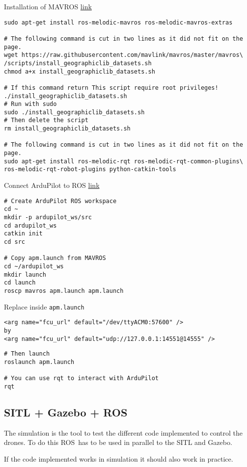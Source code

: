 Installation of MAVROS \href{http://ardupilot.org/dev/docs/ros-install.html#installing-mavros}{link}
\begin{verbatim}
sudo apt-get install ros-melodic-mavros ros-melodic-mavros-extras

# The following command is cut in two lines as it did not fit on the page.
wget https://raw.githubusercontent.com/mavlink/mavros/master/mavros\
/scripts/install_geographiclib_datasets.sh
chmod a+x install_geographiclib_datasets.sh

# If this command return This script require root privileges!
./install_geographiclib_datasets.sh
# Run with sudo
sudo ./install_geographiclib_datasets.sh
# Then delete the script
rm install_geographiclib_datasets.sh

# The following command is cut in two lines as it did not fit on the page.
sudo apt-get install ros-melodic-rqt ros-melodic-rqt-common-plugins\ ros-melodic-rqt-robot-plugins python-catkin-tools
            \end{verbatim}

Connect ArduPilot to ROS \href{http://ardupilot.org/dev/docs/ros-sitl.html}{link}
\begin{verbatim}
# Create ArduPilot ROS workspace
cd ~
mkdir -p ardupilot_ws/src
cd ardupilot_ws
catkin init
cd src

# Copy apm.launch from MAVROS
cd ~/ardupilot_ws
mkdir launch
cd launch
roscp mavros apm.launch apm.launch
            \end{verbatim}

Replace inside \texttt{apm.launch}
\begin{verbatim}
<arg name="fcu_url" default="/dev/ttyACM0:57600" />
by
<arg name="fcu_url" default="udp://127.0.0.1:14551@14555" />
            \end{verbatim}

\begin{verbatim}
# Then launch
roslaunch apm.launch

# You can use rqt to interact with ArduPilot
rqt
            \end{verbatim}

\subsection{SITL + Gazebo + ROS}
The simulation is the tool to test the different code implemented to control the drones.
To do this ROS has to be used in parallel to the SITL and Gazebo.

If the code implemented works in simulation it should also work in practice.

